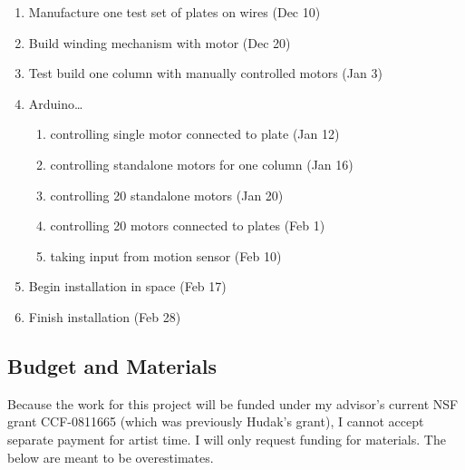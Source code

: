 \begin{enumerate}
\item Manufacture one test set of plates on wires (Dec 10)
\item Build winding mechanism with motor (Dec 20)
\item Test build one column with manually controlled motors (Jan 3)
\item Arduino\ldots
  \begin{enumerate}
     \item controlling single motor connected to plate (Jan 12)
     \item controlling standalone motors for one column (Jan 16)
     \item controlling 20 standalone motors (Jan 20)
     \item controlling 20 motors connected to plates (Feb 1)
     \item taking input from motion sensor (Feb 10)
  \end{enumerate}
\item Begin installation in space (Feb 17)
\item Finish installation (Feb 28)
\end{enumerate}

\subsection{Budget and Materials}

Because the work for this project will be funded under my advisor's current NSF grant CCF-0811665 (which was previously Hudak's grant), I cannot accept separate payment for artist time.
I will only request funding for materials.
The below are meant to be overestimates.

